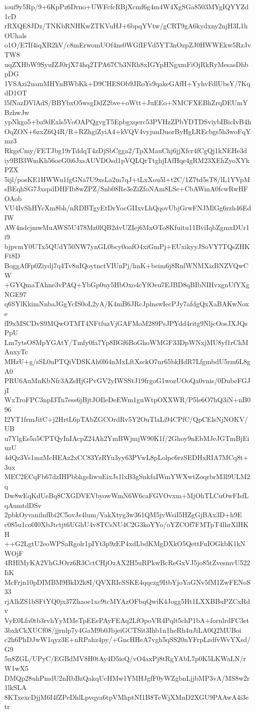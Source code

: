 ioui9y5Rp/9+6KpPz6Drno+UWFcfcRBjXcmf6g4m4W4XgSGa8503MYgIQYYZd1cD
rRXQE8JDz/TNKbRNHKwZTKVuHJ+6bpqYVtw/gCRT9gA6kydxny2njH3L1hOUhals
o1O/E7If4iqXR2kV/c8mErwomUOf4ns0WGfIFVd5YT3nOzpZJ0HWWEkw5RzJvTW8
uqZXHbW9SyuIZJ0rjX74hq2TPA67Cb3NRh8xIGYpHNgxmFiOjRkRyMesasDhbpDG
1VSAzi2uamMHYnBWbKk+D9CHESOb9JRoYs9qakeGAfH+YyhvFdlUbsY/7KqdD1OT
l5fNazDVlAdS/BBYbxO5wsgDdZ2bve+oWtt+JuEEo+NMCFXEBhZrqDEUmYBzhwJw
ypNkgo5+ba9dExls5VoOAPQgvgT5Epbgxqerc53PVHzZPbYDTDSviybIBicIvB4h
OqZON+6zxZ6Q4R/R+RZhgiZyiA4+kVQV4vyjunDuorByHgLREcbgs5h3woFqYmz3
RkgsCmy/FETJbg19rTddqT4zDjSbCgga2/TpXMauChj6jjXfcr4fCgQj1kNEHe3d
iy9BB3WmKh56oeG0i6JxsAUVDOsd1pVQLQrTtghjIAfHqe4gRM23XEhZyoXYkPZX
5ijl/posKE1HWWu1fgGNa7U9xsLa2m7qJ+tLxXou5l+t2C/1Z7td5sT8/lL1YVpM
sBEqhSG7JxspdDHFIb8wZPZ/Snb08Re3eZiZfoNAm8LSe+CbAWmA0fcwRwHFOAob
VU4IvShHYcXm8bh/nRDBTgyEtDrYocGIIxvLhQqovUbjGrwFNJMlGg6rzh46EdIW
AW4ndcjmwMuAWS5U478Mz0lQB2dvUZIej6MxOTo8Kfuitu11BviIqbZgmxDUr1i9
bjpvmY0UTx5QUdY50NW7ynGL0bcy0oafO4xiGmPj+EUxikyyJSoVY7TQsZHKFt8D
BoggAfFp0Ziydj7q4Tv8uIQoytnctVIUnPj/hnK+beim6j8RnlWNMXizBNZVQwCW
+GYQmaTAhne3vPAQ+YbGp0uy5HbOxo4cYfOeu7EJBD8qBIbNIHvxgnUfYXgNGE97
q6SYlKkimNnbaJGgYcIS0oL2yA/K4mB6JRcJplnswIecPJy7afdgQxXaBAKwNoxe
fI9xMSCDvS9MQwOTMT4NFtfuzVjGAFMoM289PsJPYdd4ritg9NljcOosJXJQsPpU
Lm7ytsO8MpYGAtY/Tmfy0fa7Yp8BGf6BoGhoWMGF33DpWNxjMU8yf1rChMAnxyTc
MHzU+g/sSL0uPTQiVDSKAh0l64nMxLftXsckO7nr65bkHdR7LfgmbdU5rm6L8gA0
PRU6AuMnKbNfr3AZsHjGPvGV2yIWSStJ19frgoG1wozUOoQa0vnis/0DubeFGJjI
WxTroFPC3npI3Tn7ess6jBjtJOIleDeEWm1guWtpOXXWR/P5le6O7hQ3iN+nB096
I2YT1frmJitC+j2HrtL6pTAbZGCOrdRv5Y2OuTlaLi94CPfC/QpCElsNjNOKV/UB
u7YlgEs5a5CPTQyInIAcpZ24Ah2YmBWjmjW90K1f/2Ghoy9nEbMJeJGTmBjEiuzU
4dQz3Vs1mzMcHEAz2xCC83YzRYu3yy63PVwL8pLolpc6rzSEDHxRIA7MCq8t+3ux
MEC2ECqFb67dzIHPbbhgsIiwuEixJs1lxB3gSnkfaIWmYWXwtZoqrbrM3l9ULM2q
Dw8wEqKdUeBq8CXGDVEVbyowWmN6W6caFGVOvxm+MjOhTLCuOwFIsfLqAumtdDSv
2pbkOyvanilnfIbi2C5ovJs4lum/VakXtyg3w361QM5jvWsiI5HZgGjBAx3D+h9E
c085u1co0I0XbJtctjt6UGhU4v8TCsNU4C2G3koYYo/oYZCOf7FMTpT4lhrXlHKH
++G2LgtU2eoWPSaRgolr1pIYt3p9zEP4xdLbdKMgDXkO5QettFuIOGkbK1kNWOjF
4RHlMyKA2VhGJOrz6R3CctCHjOzAX2H5uRPkwBcReGxVJ5jo85tZvesmvU522IiK
McFrjn10pDIMBM9BkD2k8I/QVXRIcSSKE4qqczg9ItbYjoYaGNv5fM1ZwFENoS33
rjAlkZS1bSFtYQ0jx37Zhaoe1xc9tcMYAzOFbqQwiK4Jogg5Ht1LXXBBuPZCxRdv
VyE0Lfa0tb3rvhYyMMeTpEEePAyFEAq2LfOpoVR4Pqlt5chP1bA+fornlrdFC3et
3bxkCkXUCf08/jjrnlp7y4GaM9b0JbjeiGCTSit3Ihb1n1heRh4uJiLA0Q2MUBoi
c2h6PhDJwW1qyz3E+nRPahz4py/+GncHHeA7vgh5qSS20nYFrpLzdfvWvYXsd/G9
5n8ZGL/UPyC/EGBdMV8H0tAy4D5ieQ/vO4axPj8tRgYAbL7p0K5LKWaLN/rW1wX5
DMQp28uhPmdU2nRbBzQakqUcHMw1YMHJgfF0yWZgbnLjjbMP3vA/MS8w2r1lkSLA
8KTxexcDjjM6I4fZPeDhlLpvqya6tpVMhptNI1B8TeWjXMnD2XGU9PAAwA4i3etr
